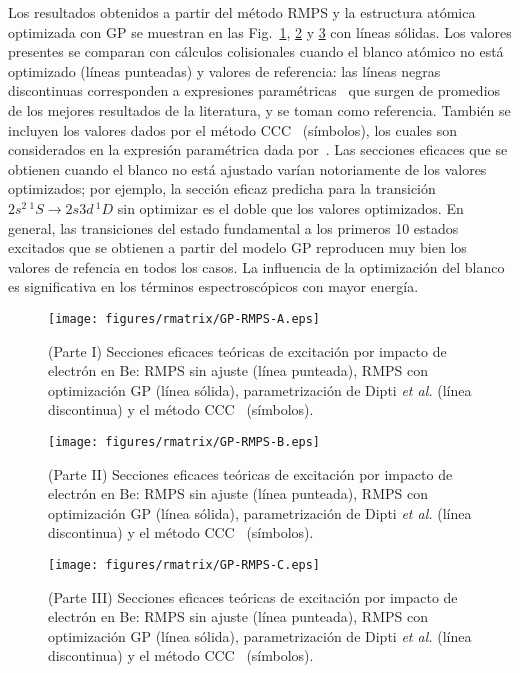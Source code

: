 Los resultados obtenidos a partir del método RMPS y la estructura 
atómica optimizada con GP se muestran en las 
Fig.~\ref{fig:crossBe-partI}, \ref{fig:crossBe-partII} y 
\ref{fig:crossBe-partIII} con líneas sólidas. Los valores presentes se 
comparan con cálculos colisionales cuando el blanco atómico no está 
optimizado (líneas punteadas) y valores de referencia: las líneas negras 
discontinuas corresponden a expresiones paramétricas~\cite{Dipti:19} que 
surgen de promedios de los mejores resultados de la literatura, y se 
toman como referencia. También se incluyen los valores dados por el 
método CCC~\cite{Fursa:97} (símbolos), los cuales son considerados en la 
expresión paramétrica dada por~\cite{Dipti:19}. 
%
Las secciones eficaces que se obtienen cuando el blanco no está ajustado 
varían notoriamente de los valores optimizados; por ejemplo, la sección 
eficaz predicha para la transición $2s^2\,^1S\rightarrow 2s3d\,^1D$ sin 
optimizar es el doble que los valores optimizados. En general, las 
transiciones del estado fundamental a los primeros 10 estados excitados
que se obtienen a partir del modelo GP reproducen muy bien los valores 
de refencia en todos los casos. La influencia de la optimización del 
blanco es significativa en los términos espectroscópicos con mayor 
energía.

\begin{figure}
\centering
\texttt{[image: figures/rmatrix/GP-RMPS-A.eps]} 
\caption[Secciones eficaces de excitación de Be (Parte I).]
{(Parte I) Secciones eficaces teóricas de excitación por impacto de 
electrón en Be: RMPS sin ajuste (línea punteada), RMPS con optimización 
GP (línea sólida), parametrización de Dipti \textit{et al.}
\cite{Dipti:19} (línea discontinua) y el método CCC~\cite{Fursa:97} 
(símbolos).}
\label{fig:crossBe-partI}
\end{figure}

\begin{figure}
\centering
\texttt{[image: figures/rmatrix/GP-RMPS-B.eps]} 
\caption[Secciones eficaces de excitación de Be (Parte II).]
{(Parte II) Secciones eficaces teóricas de excitación por impacto de 
electrón en Be: RMPS sin ajuste (línea punteada), RMPS con optimización 
GP (línea sólida), parametrización de Dipti \textit{et al.}
\cite{Dipti:19} (línea discontinua) y el método CCC~\cite{Fursa:97}
(símbolos).}
\label{fig:crossBe-partII}
\end{figure}

\begin{figure}[t]
\centering
\texttt{[image: figures/rmatrix/GP-RMPS-C.eps]} 
\caption[Secciones eficaces de excitación de Be (Parte II).]
{(Parte III) Secciones eficaces teóricas de excitación por impacto de 
electrón en Be: RMPS sin ajuste (línea punteada), RMPS con optimización 
GP (línea sólida), parametrización de Dipti \textit{et al.}
\cite{Dipti:19} (línea discontinua) y el método CCC~\cite{Fursa:97}
(símbolos).}
\label{fig:crossBe-partIII}
\end{figure}

